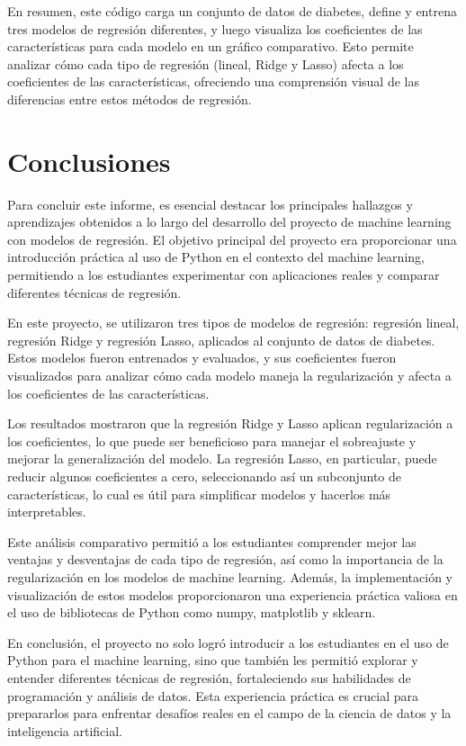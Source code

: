 \documentclass[12pt]{article}
\begin{document}
	En resumen, este código carga un conjunto de datos de diabetes, define y entrena tres modelos de regresión diferentes, y luego visualiza los coeficientes de las características para cada modelo en un gráfico comparativo. Esto permite analizar cómo cada tipo de regresión (lineal, Ridge y Lasso) afecta a los coeficientes de las características, ofreciendo una comprensión visual de las diferencias entre estos métodos de regresión.
	
	\section{Conclusiones}
	Para concluir este informe, es esencial destacar los principales hallazgos y aprendizajes obtenidos a lo largo del desarrollo del proyecto de machine learning con modelos de regresión. El objetivo principal del proyecto era proporcionar una introducción práctica al uso de Python en el contexto del machine learning, permitiendo a los estudiantes experimentar con aplicaciones reales y comparar diferentes técnicas de regresión.
	
	En este proyecto, se utilizaron tres tipos de modelos de regresión: regresión lineal, regresión Ridge y regresión Lasso, aplicados al conjunto de datos de diabetes. Estos modelos fueron entrenados y evaluados, y sus coeficientes fueron visualizados para analizar cómo cada modelo maneja la regularización y afecta a los coeficientes de las características.
	
	Los resultados mostraron que la regresión Ridge y Lasso aplican regularización a los coeficientes, lo que puede ser beneficioso para manejar el sobreajuste y mejorar la generalización del modelo. La regresión Lasso, en particular, puede reducir algunos coeficientes a cero, seleccionando así un subconjunto de características, lo cual es útil para simplificar modelos y hacerlos más interpretables.
	
	Este análisis comparativo permitió a los estudiantes comprender mejor las ventajas y desventajas de cada tipo de regresión, así como la importancia de la regularización en los modelos de machine learning. Además, la implementación y visualización de estos modelos proporcionaron una experiencia práctica valiosa en el uso de bibliotecas de Python como numpy, matplotlib y sklearn.
	
	En conclusión, el proyecto no solo logró introducir a los estudiantes en el uso de Python para el machine learning, sino que también les permitió explorar y entender diferentes técnicas de regresión, fortaleciendo sus habilidades de programación y análisis de datos. Esta experiencia práctica es crucial para prepararlos para enfrentar desafíos reales en el campo de la ciencia de datos y la inteligencia artificial.
	
	\printbibliography
	
\end{document}
